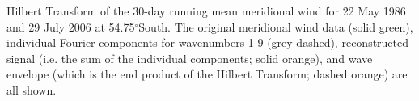 \label{fig:example_hilbert}
Hilbert Transform of the 30-day running mean meridional wind for 22 May 1986 and 29 July 2006 at 54.75$^{\circ}$South. The original meridional wind data (solid green), individual Fourier components for wavenumbers 1-9 (grey dashed), reconstructed signal (i.e. the sum of the individual components; solid orange), and wave envelope (which is the end product of the Hilbert Transform; dashed orange) are all shown.     